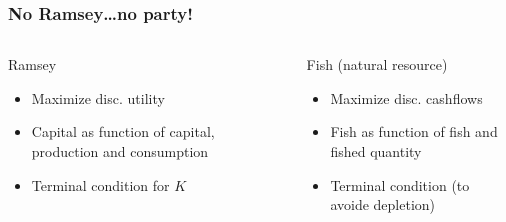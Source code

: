 \documentclass[handout,a4paper]{beamer} 			%
\begin{document}
\begin{frame}
    \frametitle{No Ramsey\ldots no party!} 
    \begin{columns}
	\begin{column}{5cm}
	    \begin{block}{Ramsey}
		\begin{itemize}
		    \item Maximize disc. utility
		
		    \item Capital as function of capital, production 
		    and consumption
		
		    \item Terminal condition for $K$
		\end{itemize}
		\end{block}
		\end{column}
\pause		
	\begin{column}{5cm}
	    \begin{block}{Fish (natural resource)}
		\begin{itemize}
		    \item Maximize disc. cashflows
		
		    \item Fish as function of fish and fished quantity
		
		    \item Terminal condition (to avoide depletion)
		\end{itemize}
		\end{block}
		\end{column}
	\end{columns}

\end{frame}
\end{document}
